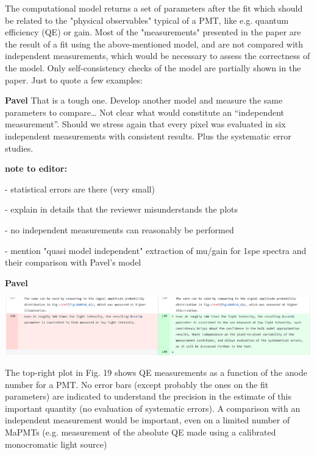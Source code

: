\documentclass[11pt]{report}
\begin{document}
\begin{tcolorbox}[enlarge top by=2em,colbacktitle=red!60!white,colframe=black!80!white,left=0pt,right=0pt,top=0pt,bottom=0pt,boxrule=0.3pt,title=\bfseries2.09]
The computational model returns a set of parameters after the fit which should be related to the "physical observables" typical of a PMT, like e.g. quantum efficiency (QE) or gain. Most of the "measurements" presented in the paper are the result of a fit using the above-mentioned model, and are not compared with independent measurements, which would be necessary to assess the correctness of the model. Only self-consistency checks of the model are partially shown in the paper. Just to quote a few examples:
\end{tcolorbox}

{\centering
\begin{tcolorbox}[enlarge top by=2em,colbacktitle=green!60!white,colframe=black!80!white,width=0.9\linewidth,left=30pt,right=30pt,top=10pt,bottom=10pt,boxrule=0.3pt,title=\bfseries our draft remarks]
	
{\bfseries Pavel}
That is a tough one. Develop another model and measure the same parameters to compare… Not clear what would constitute an “independent measurement”. Should we stress again that every pixel was evaluated in six independent measurements with consistent results. Plus the systematic error studies.

{\bfseries note to editor:}

- statistical errors are there (very small)

- explain in details that the reviewer misunderstands the plots

- no independent measurements can reasonably be performed

- mention "quasi model independent" extraction of mu/gain for 1spe spectra and their comparison with Pavel's model

{\bfseries Pavel}

\includegraphics[width=\linewidth]{round1/2.09.png}
\end{tcolorbox}
}


\begin{tcolorbox}[enlarge top by=2em,colbacktitle=black!60!white,colframe=black!80!white,left=0pt,right=0pt,top=0pt,bottom=0pt,boxrule=0.3pt,title=\bfseries2.09a]
The top-right plot in Fig. 19 shows QE measurements as a function of the anode number for a PMT. No error bars (except probably the ones on the fit parameters) are indicated to understand the precision in the estimate of this important quantity (no evaluation of systematic errors). A comparison with an independent measurement would be important, even on a limited number of MaPMTs (e.g. measurement of the absolute QE made using a calibrated monocromatic light source)
\end{tcolorbox}
\end{document}
